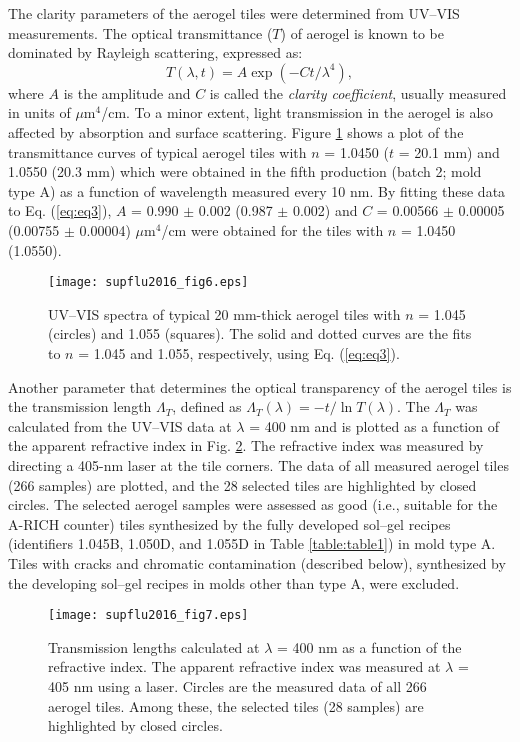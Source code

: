 \documentclass[5p,twocolumn]{elsarticle}
\begin{document}
The clarity parameters of the aerogel tiles were determined from UV--VIS measurements. The optical transmittance ($T$) of aerogel is known to be dominated by Rayleigh scattering, expressed as:
\begin{equation}
\label{eq:eq3}
T(\lambda ,t)=A\exp (-Ct/\lambda ^4),
\end{equation}
where $A$ is the amplitude and $C$ is called the \textit {clarity coefficient}, usually measured in units of $\mu $m$^4$/cm. To a minor extent, light transmission in the aerogel is also affected by absorption and surface scattering. Figure \ref{fig:fig6} shows a plot of the transmittance curves of typical aerogel tiles with $n$ = 1.0450 ($t$ = 20.1 mm) and 1.0550 (20.3 mm) which were obtained in the fifth production (batch 2; mold type A) as a function of wavelength measured every 10 nm. By fitting these data to Eq. (\ref{eq:eq3}), $A$ = 0.990 $\pm $ 0.002 (0.987 $\pm $ 0.002) and $C$ = 0.00566 $\pm $ 0.00005 (0.00755 $\pm $ 0.00004) $\mu $m$^4$/cm were obtained for the tiles with $n$ = 1.0450 (1.0550).

\begin{figure}[t]
\centering 
\texttt{[image: supflu2016\_fig6.eps]}
\caption{UV--VIS spectra of typical 20 mm-thick aerogel tiles with $n$ = 1.045 (circles) and 1.055 (squares). The solid and dotted curves are the fits to $n$ = 1.045 and 1.055, respectively, using Eq. (\ref{eq:eq3}).}
\label{fig:fig6}
\end{figure}

Another parameter that determines the optical transparency of the aerogel tiles is the transmission length $\Lambda _T$, defined as $\Lambda _T(\lambda ) = -t/\ln T(\lambda )$. The $\Lambda _T$ was calculated from the UV--VIS data at $\lambda $ = 400 nm and is plotted as a function of the apparent refractive index in Fig. \ref{fig:fig7}. The refractive index was measured by directing a 405-nm laser at the tile corners. The data of all measured aerogel tiles (266 samples) are plotted, and the 28 selected tiles are highlighted by closed circles. The selected aerogel samples were assessed as good (i.e., suitable for the A-RICH counter) tiles synthesized by the fully developed sol--gel recipes (identifiers 1.045B, 1.050D, and 1.055D in Table \ref{table:table1}) in mold type A. Tiles with cracks and chromatic contamination (described below), synthesized by the developing sol--gel recipes in molds other than type A, were excluded.

\begin{figure}[t]
\centering 
\texttt{[image: supflu2016\_fig7.eps]}
\caption{Transmission lengths calculated at $\lambda $ = 400 nm as a function of the refractive index. The apparent refractive index was measured at $\lambda $ = 405 nm using a laser. Circles are the measured data of all 266 aerogel tiles. Among these, the selected tiles (28 samples) are highlighted by closed circles.}
\label{fig:fig7}
\end{figure}
\end{document}
